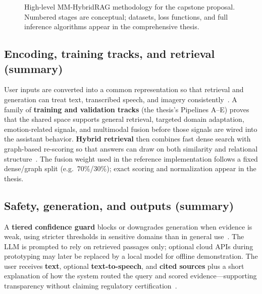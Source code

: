 \documentclass[12pt, a4paper]{article}
\begin{document}
\begin{figure}[h!]
  \caption{High-level MM-HybridRAG methodology for the capstone proposal.
    Numbered stages are conceptual; datasets, loss functions, and full inference
    algorithms appear in the comprehensive thesis.}
  \label{fig:methodology}
\end{figure}

\subsection{Encoding, training tracks, and retrieval (summary)}

User inputs are converted into a common representation so that retrieval and
generation can treat text, transcribed speech, and imagery
consistently~\cite{kadam2022multimodal}. A family of \textbf{training and
validation tracks} (the thesis's Pipelines A--E) proves that the shared space
supports general retrieval, targeted domain adaptation, emotion-related signals,
and multimodal fusion before those signals are wired into the assistant
behavior. \textbf{Hybrid retrieval} then combines fast dense search with
graph-based re-scoring so that answers can draw on both similarity and
relational structure~\cite{sarmah2024hybridrag,lewis2020rag}. The fusion weight
used in the reference implementation follows a fixed dense/graph split
(e.g.\ 70\%/30\%); exact scoring and normalization appear in the thesis.

\subsection{Safety, generation, and outputs (summary)}

A \textbf{tiered confidence guard} blocks or downgrades generation when
evidence is weak, using stricter thresholds in sensitive domains than in general
use~\cite{tang2024multihop}. The LLM is prompted to rely on retrieved passages
only; optional cloud APIs during prototyping may later be replaced by a local
model for offline demonstration. The user receives \textbf{text}, optional
\textbf{text-to-speech}, and \textbf{cited sources} plus a short explanation of
how the system routed the query and scored evidence---supporting transparency
without claiming regulatory certification~\cite{pan2024unifying}.
\end{document}
